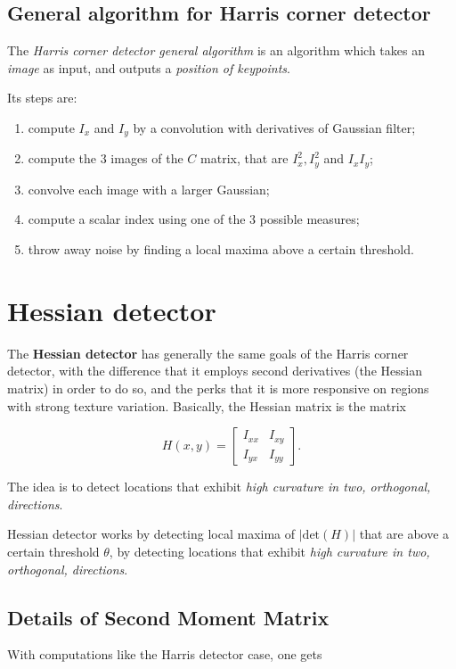 \documentclass[10pt]{report}
\begin{document}
\subsection{General algorithm for Harris corner detector}
\label{general-algorithm-for-harris-corner-detector}
The \emph{Harris corner detector general algorithm} is an algorithm which
takes an \emph{image} as input, and outputs a \emph{position of keypoints}.

Its steps are:

\begin{enumerate}
\item compute \(I_x\) and \(I_y\) by a convolution with derivatives of
Gaussian filter;
\item compute the \(3\) images of the \(C\) matrix, that are
\(I^2_x, I^2_y\) and \(I_x I_y\);
\item convolve each image with a larger Gaussian;
\item compute a scalar index using one of the \(3\) possible measures;
\item throw away noise by finding a local maxima above a certain threshold.
\end{enumerate}

\section{Hessian detector}
\label{hessian-detector}
The \textbf{Hessian detector} has generally the same goals of the Harris corner
detector, with the difference that it employs second derivatives (the
Hessian matrix) in order to do so, and the perks that it is more
responsive on regions with strong texture variation. Basically, the
Hessian matrix is the matrix

\[H(x, y) = \begin{bmatrix} I_{xx} & I_{xy} \\ I_{yx} & I_{yy}\end{bmatrix}.\]

The idea is to detect locations that exhibit \emph{high curvature in two,
orthogonal, directions}.

Hessian detector works by detecting local maxima of \(|\mbox{det}(H)|\)
that are above a certain threshold \(\theta\), by detecting locations
that exhibit \emph{high curvature in two, orthogonal, directions}.

\subsection{Details of Second Moment Matrix}
\label{details-of-second-moment-matrix}
With computations like the Harris detector case, one gets
\end{document}

